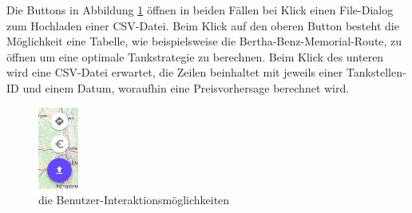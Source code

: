\documentclass[
ngerman          %
,a4paper          %
,11pt
,pdftex
]{report}
\begin{document}
Die Buttons in Abbildung \ref{fig:install3} öffnen in beiden Fällen bei Klick einen File-Dialog zum Hochladen einer CSV-Datei.
Beim Klick auf den oberen Button besteht die Möglichkeit eine Tabelle, wie beispielsweise die Bertha-Benz-Memorial-Route, zu öffnen um eine optimale Tankstrategie zu berechnen. Beim Klick des unteren wird eine CSV-Datei erwartet, die Zeilen beinhaltet mit jeweils einer Tankstellen-ID und einem Datum, woraufhin eine Preisvorhersage berechnet wird.
\begin{figure}[H]
\centering
\includegraphics[width=50px]{install3.jpg}
\caption{die Benutzer-Interaktionsmöglichkeiten}
\label{fig:install3}
\end{figure}
\end{document}
